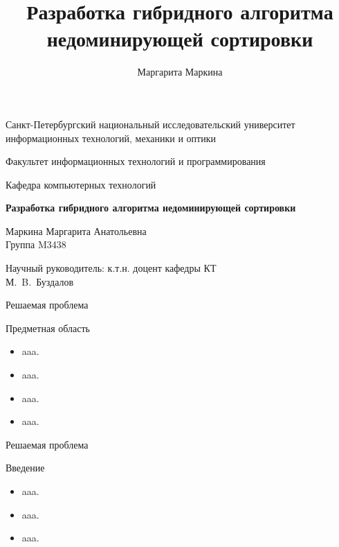 \documentclass{beamer}
\title[Гибридный алгоритм недоминирующей сортировки]{Разработка гибридного алгоритма недоминирующей сортировки}
\author[Маргарита Маркина]{Маргарита Маркина}
\institute[Университет ИТМО]{Национальный исследовательский университет информационных технологий, механики и оптики}
\date{}
\begin{document}
\begin{frame}
\begin{center}
{\scriptsize Санкт-Петербургский национальный исследовательский университет \\ информационных технологий, механики и оптики}

\vspace{1cm}

{\scriptsize Факультет информационных технологий и программирования

Кафедра компьютерных технологий}

\vspace{1cm}

\vbox{\large\bfseries
Разработка гибридного алгоритма недоминирующей сортировки}

\vspace{1cm}

{\large Маркина Маргарита Анатольевна \\}
{\large Группа M3438}


\vspace{1cm}

{\large Научный руководитель: к.т.н. доцент кафедры КТ \\}
{\large М.~B.~Буздалов}


\end{center}
\end{frame}


\begin{frame}{Решаемая проблема}
\begin{block}{Предметная область}
\begin{itemize}
\item aaa.
\item aaa.
\item aaa.
\item aaa.
\end{itemize}
\end{block}
\end{frame}

\begin{frame}{Решаемая проблема}
\begin{block}{Введение}
\begin{itemize}
\item aaa.
\item aaa.
\item aaa.
\begin{center}
\end{center}
\end{itemize}
\end{block}
\end{frame}
\end{document}

